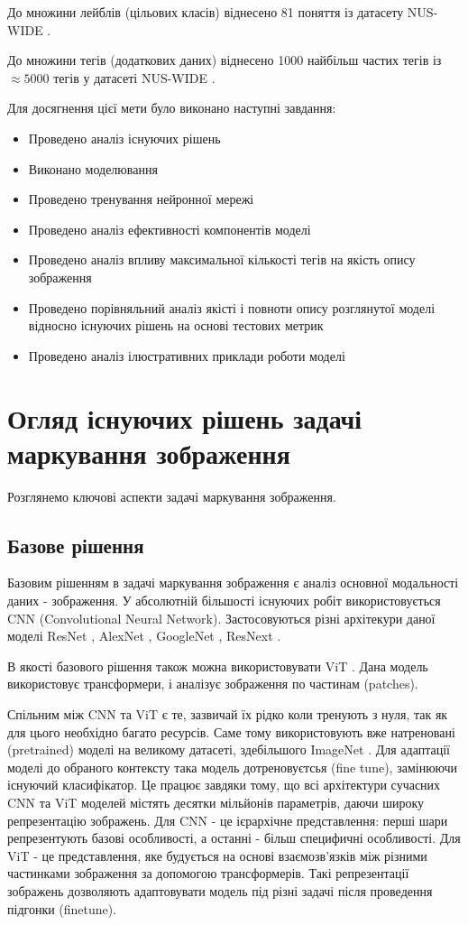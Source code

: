 \documentclass{udstu}
\begin{document}
До множини лейблів (цільових класів) віднесено 81 поняття із датасету NUS-WIDE \cite{nus-wide-civr09}.

До множини тегів (додаткових даних) віднесено 1000 найбільш частих тегів із $\approx 5000$ тегів у
датасеті NUS-WIDE \cite{nus-wide-civr09}.

Для досягнення цієї мети було виконано наступні завдання:

\begin{itemize}
	\item Проведено аналіз існуючих рішень
	\item Виконано моделювання
	\item Проведено тренування нейронної мережі
	\item Проведено аналіз ефективності компонентів моделі
	\item Проведено аналіз впливу максимальної кількості тегів на якість опису зображення
	\item Проведено порівняльний аналіз якісті і повноти опису розглянутої моделі
	відносно існуючих рішень на основі тестових метрик
	\item Проведено аналіз ілюстративних приклади роботи моделі
\end{itemize}


\chapter{Огляд існуючих рішень задачі маркування зображення}

Розглянемо ключові аспекти задачі маркування зображення.

\section{Базове рішення}

Базовим рішенням в задачі маркування зображення є аналіз основної модальності даних - зображення.
У абсолютній більшості існуючих робіт використовується CNN (Convolutional Neural Network).
Застосовуються різні архітекури даної моделі ResNet \cite{resnet}, AlexNet \cite{alexnet},
GoogleNet \cite{googlenet}, ResNext \cite{resnext}.

В якості базового рішення також можна використовувати ViT \cite{vit}. Дана модель використовує
трансформери, і аналізує зображення по частинам (patches).

Спільним між CNN та ViT є те, зазвичай їх рідко коли тренують з нуля, так як для цього необхідно багато ресурсів.
Саме тому використовують вже натреновані (pretrained) моделі на великому датасеті,
здебільшого ImageNet \cite{deng2009imagenet}.
Для адаптації моделі до обраного контексту така модель дотреновуєтсья (fine tune), замінюючи існуючий класифікатор.
Це працює завдяки тому, що всі архітектури сучасних CNN та ViT моделей містять десятки мільйонів параметрів,
даючи широку репрезентацію зображень. Для CNN - це ієрархічне представлення: перші шари репрезентують базові
особливості, а останні - більш специфичні особливості. Для ViT - це представлення, яке будується
на основі взаємозв'язків між різними частинками зображення за допомогою трансформерів.
Такі репрезентації зображень дозволяють адаптовувати модель під різні задачі після проведення підгонки (finetune).
\end{document}
